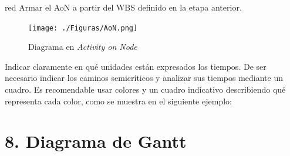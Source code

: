 \documentclass[11pt]{charter}
\begin{document}
\begin{consigna}{red}
Armar el AoN a partir del WBS definido en la etapa anterior. 



\end{consigna}

\begin{figure}[htpb]
\centering 
\texttt{[image: ./Figuras/AoN.png]}
\caption{Diagrama en \textit{Activity on Node}}
\label{fig:AoN}
\end{figure}

Indicar claramente en qué unidades están expresados los tiempos.
De ser necesario indicar los caminos semicríticos y analizar sus tiempos mediante un cuadro.
Es recomendable usar colores y un cuadro indicativo describiendo qué representa cada color, como se muestra en el siguiente ejemplo:



\section{8. Diagrama de Gantt}
\label{sec:gantt}
\end{document}
